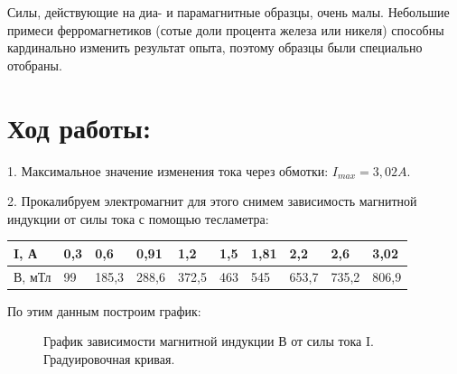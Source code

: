\documentclass[11pt]{article}
\begin{document}
Силы, действующие на диа- и парамагнитные образцы, очень малы. Небольшие примеси ферромагнетиков (сотые доли процента железа или никеля) способны кардинально изменить результат опыта, поэтому образцы были специально отобраны.







\section{Ход работы:}

1. Максимальное значение изменения тока через обмотки: $I_{max}=3,02A$.

2. Прокалибруем электромагнит для этого снимем зависимость магнитной индукции от силы тока с помощью тесламетра:

\begin{table}[!ht]
    \centering
    \begin{tabular}{|l|l|l|l|l|l|l|l|l|l|}
    \hline
        I, А & 0,3 & 0,6 & 0,91 & 1,2 & 1,5 & 1,81 & 2,2 & 2,6 & 3,02 \\ \hline
        В, мТл & 99 & 185,3 & 288,6 & 372,5 & 463 & 545 & 653,7 & 735,2 & 806,9 \\ \hline
    \end{tabular}
\end{table}


По этим данным построим график:

\begin{figure}[H]
\caption{График зависимости магнитной индукции В от силы тока I. Градуировочная кривая.}
\label{pic:3}
\end{figure}
\end{document}
